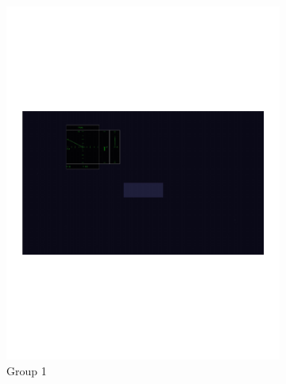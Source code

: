 \documentclass[]{aiaa-tc}%
\begin{document}
\begin{figure}[b!]
  \centering
  \begin{subfigure}{.5\textwidth}
    \centering
    \includegraphics[width=.99\linewidth, page=1]{figs/guidance_full.pdf}
    \caption{Group 1}
    \label{fig:sub1}
  \end{subfigure}%
  \begin{subfigure}{.5\textwidth}
    \centering

\end{subfigure}
\end{figure}
\end{document}

